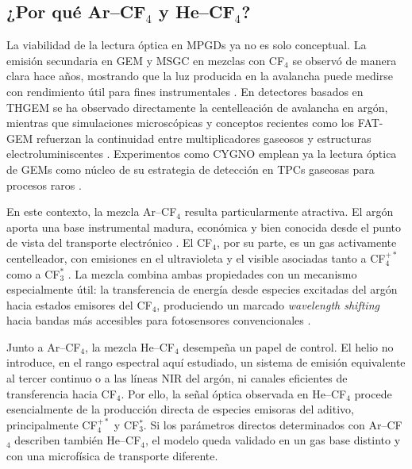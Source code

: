 \documentclass[12pt,a4paper]{article}
\begin{document}
\subsection{¿Por qué Ar--CF$_4$ y He--CF$_4$?}

La viabilidad de la lectura óptica en MPGDs ya no es solo conceptual. La emisión secundaria en GEM y MSGC en mezclas con CF$_4$ se observó de manera clara hace años, mostrando que la luz producida en la avalancha puede medirse con rendimiento útil para fines instrumentales \cite{fraga2003the,morozov2012secondary}. En detectores basados en THGEM se ha observado directamente la centelleación de avalancha en argón, mientras que simulaciones microscópicas y conceptos recientes como los FAT-GEM refuerzan la continuidad entre multiplicadores gaseosos y estructuras electroluminiscentes \cite{bondara2010direct,oliveira2012simulation,williams2024fatgems}. Experimentos como CYGNO emplean ya la lectura óptica de GEMs como núcleo de su estrategia de detección en TPCs gaseosas para procesos raros \cite{torelli2022the}.

En este contexto, la mezcla Ar--CF$_4$ resulta particularmente atractiva. El argón aporta una base instrumental madura, económica y bien conocida desde el punto de vista del transporte electrónico \cite{zatsarinny2013comparisons,biagi1999monte}. El CF$_4$, por su parte, es un gas activamente centelleador, con emisiones en el ultravioleta y el visible asociadas tanto a CF$_4^{+*}$ como a CF$_3^*$ \cite{washida1983emission,morozov2010photon,lehaut2015scintillation}. La mezcla combina ambas propiedades con un mecanismo especialmente útil: la transferencia de energía desde especies excitadas del argón hacia estados emisores del CF$_4$, produciendo un marcado \emph{wavelength shifting} hacia bandas más accesibles para fotosensores convencionales \cite{amedo2023observation,gonzlezdaz2024primary,veenhof2025primary}.

Junto a Ar--CF$_4$, la mezcla He--CF$_4$ desempeña un papel de control. El helio no introduce, en el rango espectral aquí estudiado, un sistema de emisión equivalente al tercer continuo o a las líneas NIR del argón, ni canales eficientes de transferencia hacia CF$_4$. Por ello, la señal óptica observada en He--CF$_4$ procede esencialmente de la producción directa de especies emisoras del aditivo, principalmente CF$_4^{+*}$ y CF$_3^*$. Si los parámetros directos determinados con Ar--CF$_4$ describen también He--CF$_4$, el modelo queda validado en un gas base distinto y con una microfísica de transporte diferente.
\end{document}
